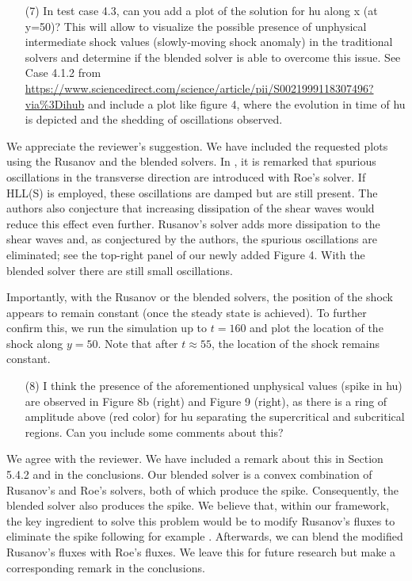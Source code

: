 \documentclass[english,11pt]{article}
\begin{document}
\bigskip
{\color{OliveGreen}
  \begin{itemize}
  \item[(7)]
    In test case 4.3, can you add a plot of the solution for hu along x (at y=50)? 
    This will allow to visualize the possible presence of unphysical intermediate shock values 
    (slowly-moving shock anomaly) in the traditional solvers and determine if the blended solver 
    is able to overcome this issue. 
    See Case 4.1.2 from \url{https://www.sciencedirect.com/science/article/pii/S0021999118307496?via\%3Dihub}
    and include a plot like figure 4, where the evolution in time of hu is depicted and the shedding of 
    oscillations observed.
  \end{itemize}
}
\noindent
We appreciate the reviewer's suggestion. 
We have included the requested plots using the Rusanov and the blended solvers.
In \cite[Section 4.1.2]{navas2019improved}, it is remarked that spurious oscillations in the transverse direction
are introduced with Roe's solver. If HLL(S) is employed, these oscillations are damped but are still present.
The authors also conjecture that increasing dissipation of the shear waves would reduce this effect even further.
Rusanov's solver adds more dissipation to the shear waves and, as conjectured by the authors,
the spurious oscillations are eliminated; see the top-right panel of our newly added Figure 4.
With the blended solver there are still small oscillations. 

Importantly, with the Rusanov or the blended solvers, the position of the shock appears to remain constant
(once the steady state is achieved).
To further confirm this, we run the simulation up to $t=160$ and plot the location of the shock along $y=50$.
Note that after $t\approx 55$, the location of the shock remains constant.


\bigskip
{\color{OliveGreen}
  \begin{itemize}
  \item[(8)]
    I think the presence of the aforementioned unphysical values (spike in hu) are observed in Figure 8b (right) 
    and Figure 9 (right), as there is a ring of amplitude above (red color) for hu separating the supercritical 
    and subcritical regions. Can you include some comments about this?
  \end{itemize}
}
\noindent
We agree with the reviewer. We have included a remark about this in Section 5.4.2 and in the conclusions.
Our blended solver is a convex combination of Rusanov's and Roe's solvers,
both of which produce the spike. Consequently, the blended solver also produces the spike. 
We believe that, within our framework, the key ingredient to solve this problem would be to modify
Rusanov's fluxes to eliminate the spike following for example \cite[Section 5.1]{navas2019improved}.
Afterwards, we can blend the modified Rusanov's fluxes with Roe's fluxes.
We leave this for future research but make a corresponding remark in the conclusions. 
\end{document}
